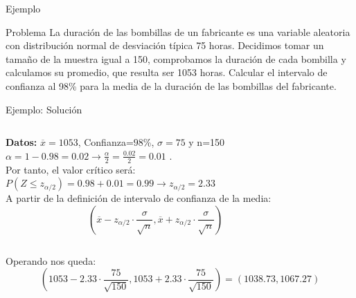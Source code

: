 \documentclass[11pt,handout]{beamer}
\begin{document}
\begin{frame}
{Ejemplo}
\begin{block}{Problema} La duración de las bombillas de un fabricante es una variable aleatoria con distribución
normal de desviación típica 75 horas. Decidimos tomar un tamaño de la muestra igual a 150, comprobamos la duración de cada
bombilla y calculamos su promedio, que resulta ser 1053 horas. Calcular el intervalo de confianza al 98\%
para la media de la duración de las bombillas del fabricante.
\end{block}
\end{frame}

\begin{frame}{Ejemplo: Solución}
\begin{columns}
\begin{column}{0.5\textwidth}
    \textbf{Datos:} $\overline{x}=1053$, Confianza=$98$\%, $\sigma=75$ y n=150 \\
    $\alpha=1-0.98=0.02 \to \frac{\alpha}{2}=\frac{0.02}{2}=0.01$
    . \\ Por tanto, el valor crítico será: \\
    $P\left(Z \leqslant z_{\alpha / 2} \right)= 0.98 + 0.01 = 0.99 \to z_{\alpha / 2} = 2.33$ \\
    A partir de la definición de intervalo de confianza de la media:
    $$ \left( \overline{x} - z_{\alpha / 2}\cdot \frac{\sigma}{\sqrt{n}} ,  \overline{x} + z_{\alpha / 2}\cdot \frac{\sigma}{\sqrt{n}}
    \right)$$

\end{column}
\begin{column}{0.5\textwidth}
\end{column}
\end{columns}
    
    Operando nos queda:
    $$ \left( 1053 - 2.33 \cdot \frac{75}{\sqrt{150}} ,  1053 + 2.33 \cdot \frac{75}{\sqrt{150}}
    \right)=\left(1038.73 ,  1067.27\right)
    $$
\end{frame}
\end{document}
